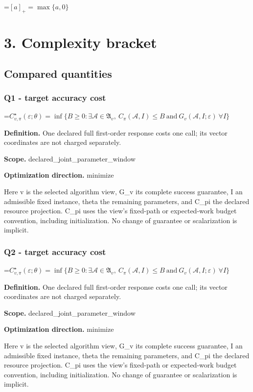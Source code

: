 \documentclass[10pt,a4paper]{article}
\newcommand{\AtlasMath}[1]{\par\begingroup\centering\setbox0=\hbox{$\displaystyle #1$}\ifdim\wd0>1.4\linewidth\typeout{ATLAS WIDE FORMULA: \the\wd0}\fi\ifdim\wd0>\linewidth\resizebox{\linewidth}{!}{\box0}\else\box0\fi\par\endgroup}
\begin{document}
\AtlasMath{[a]_+=\max\{a,0\}}


\section{3. Complexity bracket}
\subsection{Compared quantities}
\subsubsection{Q1 - target accuracy cost}
\AtlasMath{C^\star_{v,\pi}(\varepsilon;\theta)=\inf\{B\ge0:\exists\mathcal A\in\mathfrak A_v,\ C_\pi(\mathcal A,I)\le B\ \text{and}\ G_v(\mathcal A,I;\varepsilon)\ \forall I\}}
\textbf{Definition.} One declared full first-order response costs one call; its vector coordinates are not charged separately.

\textbf{Scope.} declared\_joint\_parameter\_window

\textbf{Optimization direction.} minimize

Here v is the selected algorithm view, G\_v its complete success guarantee, I an admissible fixed instance, theta the remaining parameters, and C\_pi the declared resource projection. C\_pi uses the view's fixed-path or expected-work budget convention, including initialization. No change of guarantee or scalarization is implicit.

\subsubsection{Q2 - target accuracy cost}
\AtlasMath{C^\star_{v,\pi}(\varepsilon;\theta)=\inf\{B\ge0:\exists\mathcal A\in\mathfrak A_v,\ C_\pi(\mathcal A,I)\le B\ \text{and}\ G_v(\mathcal A,I;\varepsilon)\ \forall I\}}
\textbf{Definition.} One declared full first-order response costs one call; its vector coordinates are not charged separately.

\textbf{Scope.} declared\_joint\_parameter\_window

\textbf{Optimization direction.} minimize

Here v is the selected algorithm view, G\_v its complete success guarantee, I an admissible fixed instance, theta the remaining parameters, and C\_pi the declared resource projection. C\_pi uses the view's fixed-path or expected-work budget convention, including initialization. No change of guarantee or scalarization is implicit.
\end{document}
